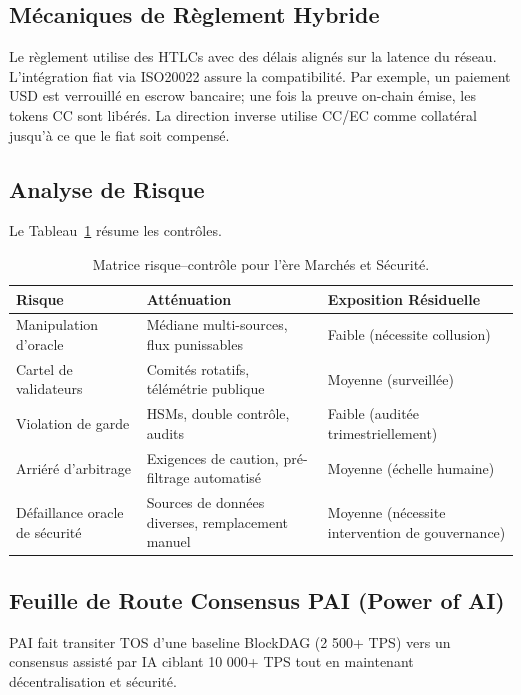 \documentclass[11pt]{article}
\begin{document}
\subsection{Mécaniques de Règlement Hybride}
Le règlement utilise des HTLCs avec des délais alignés sur la latence du réseau. L'intégration fiat via ISO20022 assure la compatibilité. Par exemple, un paiement USD est verrouillé en escrow bancaire; une fois la preuve on-chain émise, les tokens CC sont libérés. La direction inverse utilise CC/EC comme collatéral jusqu'à ce que le fiat soit compensé.

\subsection{Analyse de Risque}
Le Tableau~\ref{tab:risk-markets} résume les contrôles.

\begin{table}[H]
  \centering
  \begin{tabular}{p{}p{}p{}}
    \toprule
    \textbf{Risque} & \textbf{Atténuation} & \textbf{Exposition Résiduelle} \\
    \midrule
    Manipulation d'oracle & Médiane multi-sources, flux punissables & Faible (nécessite collusion) \\
    Cartel de validateurs & Comités rotatifs, télémétrie publique & Moyenne (surveillée) \\
    Violation de garde & HSMs, double contrôle, audits & Faible (auditée trimestriellement) \\
    Arriéré d'arbitrage & Exigences de caution, pré-filtrage automatisé & Moyenne (échelle humaine) \\
    Défaillance oracle de sécurité & Sources de données diverses, remplacement manuel & Moyenne (nécessite intervention de gouvernance) \\
    \bottomrule
  \end{tabular}
  \caption{Matrice risque--contrôle pour l'ère Marchés et Sécurité.}
  \label{tab:risk-markets}
\end{table}

\subsection{Feuille de Route Consensus PAI (Power of AI)}
\label{sec:pai-roadmap}
PAI fait transiter TOS d'une baseline BlockDAG (2 500+ TPS) vers un consensus assisté par IA ciblant 10 000+ TPS tout en maintenant décentralisation et sécurité.
\end{document}
